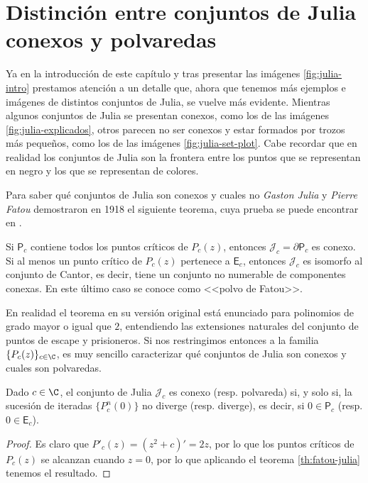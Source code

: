 \section{Distinción entre conjuntos de Julia conexos y polvaredas}
\label{section:conexos-polvaredas}

Ya en la introducción de este capítulo y tras presentar las imágenes \ref{fig:julia-intro} prestamos atención a un detalle que, ahora que tenemos más ejemplos e imágenes de distintos conjuntos de Julia, se vuelve más evidente. Mientras algunos conjuntos de Julia se presentan conexos, como los de las imágenes \ref{fig:julia-explicados}, otros parecen no ser conexos y estar formados por trozos más pequeños, como los de las imágenes \ref{fig:julia-set-plot}. Cabe recordar que en realidad los conjuntos de Julia son la frontera entre los puntos que se representan en negro y los que se representan de colores.

Para saber qué conjuntos de Julia son conexos y cuales no \textit{Gaston Julia} y \textit{Pierre Fatou} demostraron en 1918 el siguiente teorema, cuya prueba se puede encontrar en \cite[Theorem 9.5]{John-Milnor}.

\begin{teorema}
  \label{th:fatou-julia}
  Si $\mathsf{P}_c$ contiene todos los puntos críticos de $P_c(z)$, entonces $\mathcal{J}_c=\partial \mathsf{P}_c$ es conexo. Si al menos un punto crítico de $P_c(z)$ pertenece a $\mathsf{E}_c$, entonces $\mathcal{J}_c$ es isomorfo al conjunto de Cantor, es decir, tiene un conjunto no numerable de componentes conexas. En este último caso se conoce como <<polvo de Fatou>>.
\end{teorema}

En realidad el teorema en su versión original está enunciado para polinomios de grado mayor o igual que $2$, entendiendo las extensiones naturales del conjunto de puntos de escape y prisioneros. Si nos restringimos entonces a la familia $\{P_c(z)\}_{c\in\C}$, es muy sencillo caracterizar qué conjuntos de Julia son conexos y cuales son polvaredas.

\begin{corolario}
  \label{th:conexo-polvareda}
  Dado $c\in\C$, el conjunto de Julia $\mathcal{J}_c$ es conexo (resp. polvareda) si, y solo si, la sucesión de iteradas $\{P_c^n(0)\}$ no diverge (resp. diverge), es decir, si $0\in\mathsf{P}_c$ (resp. $0\in\mathsf{E}_c$).
\end{corolario}
\begin{proof}
  Es claro que $P'_c(z)=(z^2+c)'=2z$, por lo que los puntos críticos de $P_c(z)$ se alcanzan cuando $z=0$, por lo que aplicando el teorema \ref{th:fatou-julia} tenemos el resultado.
\end{proof}

